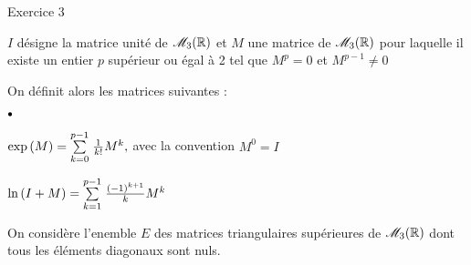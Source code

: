 \documentclass[11pt]{article}%
\begin{document}
{\Large Exercice 3}

$I$ désigne la matrice unité de $\mathscr{M}_{3}(\mathbb{R}) $ et $M$ une matrice de $\mathscr{M}_{3}(\mathbb{R}) $
pour laquelle il existe un entier $p$ supérieur ou égal à 2 tel
que $M^{p} = 0$ et $M^{p-1}\ne 0$

On définit alors les matrices suivantes :

\begin{noliste}{$\scriptstyle \bullet$}
\item $\exp \left( M\right) = {\textstyle\sum\limits_{k = 0}^{p-1}}\hspace{.1cm}\frac{1}{k!}M^{k},$ avec
la convention 
$M^{0} = I$

\item $\ln \left( I + M\right) = {\textstyle\sum\limits_{k = 1}^{p-1}}\hspace{.1cm}\frac{\left( -1\right)
^{k + 1}}{k}M^{k} $
\end{noliste}

On considère l'enemble $E$ des matrices triangulaires supérieures de 
$\mathscr{M}_{3}(\mathbb{R}) $ dont tous les éléments
diagonaux sont nuls.
\end{document}
